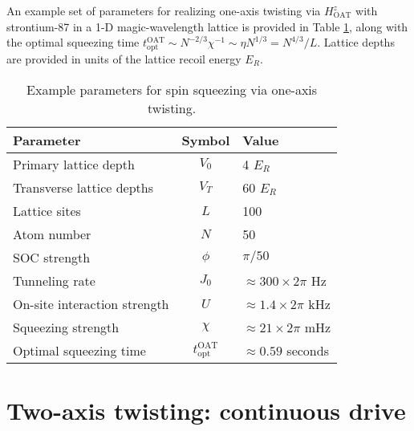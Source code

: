 \documentclass[aps,notitlepage,nofootinbib,11pt]{revtex4-1}
\renewcommand{\t}{\text} %
\newcommand{\1}{\mathds{1}}
\begin{document}
An example set of parameters for realizing one-axis twisting via
$H_{\t{OAT}}^z$ with strontium-87 in a 1-D magic-wavelength lattice is
provided in Table \ref{tab:parameters}, along with the optimal
squeezing time
$t_{\t{opt}}^{\t{OAT}}\sim N^{-2/3}\chi^{-1}\sim\eta
N^{1/3}=N^{4/3}/L$.  Lattice depths are provided in units of the
lattice recoil energy $E_R$.

\begin{table}[h]
  \centering
  \caption{Example parameters for spin squeezing via one-axis
    twisting.}
  \label{tab:parameters}
  \begin{tabular}{|l|c|l|}
    \hline
    Parameter & Symbol & Value \\ \hline\hline
    Primary lattice depth & $V_0$ & 4 $E_R$ \\
    Transverse lattice depths & $V_T$ & 60 $E_R$ \\
    Lattice sites & $L$ & 100 \\
    Atom number & $N$ & 50 \\
    SOC strength & $\phi$ & $\pi/50$ \\ \hline\hline
    Tunneling rate & $J_0$ & $\approx300\times2\pi$ Hz \\
    On-site interaction strength & $U$ & $\approx1.4\times2\pi$ kHz \\
    Squeezing strength & $\chi$ & $\approx21\times2\pi$ mHz \\
    Optimal squeezing time & $t_{\t{opt}}^{\t{OAT}}$
    & $\approx0.59$ seconds \\ \hline
  \end{tabular}
\end{table}


\section{Two-axis twisting: continuous drive}
\label{sec:continuous_drive}
\end{document}
